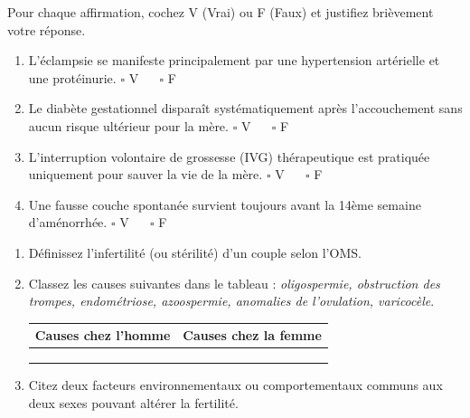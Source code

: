 \documentclass[11pt]{article}
\begin{document}
\begin{exercice}
Pour chaque affirmation, cochez V (Vrai) ou F (Faux) et justifiez brièvement votre réponse.
\begin{enumerate}
    \item L'éclampsie se manifeste principalement par une hypertension artérielle et une protéinurie. \hfill $\square$ V $\quad$ $\square$ F
    \item Le diabète gestationnel disparaît systématiquement après l'accouchement sans aucun risque ultérieur pour la mère. \hfill $\square$ V $\quad$ $\square$ F
    \item L'interruption volontaire de grossesse (IVG) thérapeutique est pratiquée uniquement pour sauver la vie de la mère. \hfill $\square$ V $\quad$ $\square$ F
    \item Une fausse couche spontanée survient toujours avant la 14ème semaine d'aménorrhée. \hfill $\square$ V $\quad$ $\square$ F
\end{enumerate}
\end{exercice}

\begin{exercice}
\begin{enumerate}
    \item Définissez l'infertilité (ou stérilité) d'un couple selon l'OMS.
    \item Classez les causes suivantes dans le tableau : \textit{oligospermie, obstruction des trompes, endométriose, azoospermie, anomalies de l'ovulation, varicocèle}.
    
    \begin{tabular}{|p{5cm}|p{5cm}|}
    \hline
    \textbf{Causes chez l'homme} & \textbf{Causes chez la femme} \\ \hline
     &  \\ \hline
     &  \\ \hline
     &  \\ \hline
    \end{tabular}
    
    \item Citez deux facteurs environnementaux ou comportementaux communs aux deux sexes pouvant altérer la fertilité.
\end{enumerate}
\end{exercice}
\end{document}
